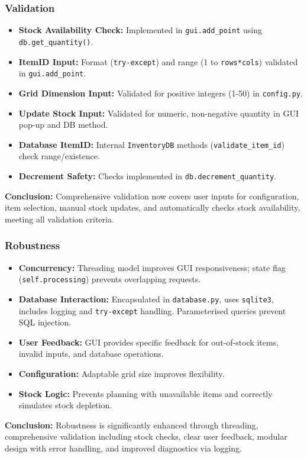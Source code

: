 \subsubsection{Validation}
	\begin{itemize}
		\item \textbf{Stock Availability Check:} Implemented in \verb|gui.add_point| using \verb|db.get_quantity()|.
		\item \textbf{ItemID Input:} Format (\verb|try-except|) and range (1 to \verb|rows*cols|) validated in \verb|gui.add_point|.
		\item \textbf{Grid Dimension Input:} Validated for positive integers (1-50) in \verb|config.py|.
		\item \textbf{Update Stock Input:} Validated for numeric, non-negative quantity in GUI pop-up and DB method.
		\item \textbf{Database ItemID:} Internal \verb|InventoryDB| methods (\verb|validate_item_id|) check range/existence.
		\item \textbf{Decrement Safety:} Checks implemented in \verb|db.decrement_quantity|.
	\end{itemize}
	\textbf{Conclusion:} Comprehensive validation now covers user inputs for configuration, item selection, manual stock updates, and automatically checks stock availability, meeting all validation criteria.
	
\subsubsection{Robustness}
	\begin{itemize}
		\item \textbf{Concurrency:} Threading model improves GUI responsiveness; state flag (\verb|self.processing|) prevents overlapping requests.
		\item \textbf{Database Interaction:} Encapsulated in \verb|database.py|, uses \verb|sqlite3|, includes logging and \verb|try-except| handling. Parameterised queries prevent SQL injection.
		\item \textbf{User Feedback:} GUI provides specific feedback for out-of-stock items, invalid inputs, and database operations.
		\item \textbf{Configuration:} Adaptable grid size improves flexibility.
		\item \textbf{Stock Logic:} Prevents planning with unavailable items and correctly simulates stock depletion.
	\end{itemize}
	\textbf{Conclusion:} Robustness is significantly enhanced through threading, comprehensive validation including stock checks, clear user feedback, modular design with error handling, and improved diagnostics via logging.
		
